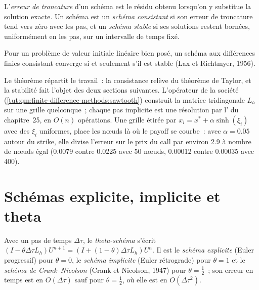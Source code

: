\begin{definition}\label{def:qm:finite-difference-methods:consistent}
L'\emph{erreur de troncature} d'un schéma est le résidu obtenu lorsqu'on y substitue la solution exacte. Un schéma est un \emph{schéma consistant} si son
erreur de troncature tend vers zéro avec les pas, et un \emph{schéma stable} si ses solutions restent bornées, uniformément en les pas, sur un intervalle de temps fixé.
\end{definition}

\begin{theorem}\label{thm:qm:finite-difference-methods:lax}
Pour un problème de valeur initiale linéaire bien posé, un schéma aux différences finies consistant converge si et seulement s'il est stable (Lax et Richtmyer, 1956).
\end{theorem}

Le théorème répartit le travail~: la consistance relève du théorème de Taylor, et la stabilité fait l'objet des deux sections suivantes. L'opérateur de la société (\cref{tut:qm:finite-difference-methods:sawtooth}) construit la
matrice tridiagonale $L_h$ sur une grille quelconque~; chaque pas implicite est une résolution par l' du chapitre~25, en $O(n)$ opérations. Une grille étirée par $x_i = x^* + \alpha\sinh(\xi_i)$ avec
des $\xi_i$ uniformes, place les nœuds là où le payoff se courbe~: avec $\alpha = 0.05$ autour du strike, elle divise l'erreur sur le prix du call par environ 2.9 à nombre de nœuds égal (0.0079 contre 0.0225 avec 50
nœuds, 0.00012 contre 0.00035 avec 400).

\section{Schémas explicite, implicite et theta}

\begin{definition}\label{def:qm:finite-difference-methods:theta}
Avec un pas de temps $\Delta\tau$, le \emph{theta-schéma} s'écrit $(I - \theta\Delta\tau L_h)U^{n+1} = (I + (1 - \theta)\Delta\tau L_h)U^n$. Il est le \emph{schéma explicite}
(Euler progressif) pour $\theta = 0$, le \emph{schéma implicite} (Euler rétrograde) pour $\theta = 1$ et le \emph{schéma de Crank--Nicolson} (Crank et Nicolson,
1947) pour $\theta = \frac12$~; son erreur en temps est en $O(\Delta\tau)$ sauf pour $\theta = \frac12$, où elle est en $O(\Delta\tau^2)$.
\end{definition}

